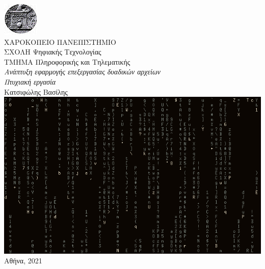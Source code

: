 \thispagestyle{plain}
  \begin{center}
    \includegraphics[scale=1]{"hua.png"}\\
    \vspace{1cm}
    {\huge ΧΑΡΟΚΟΠΕΙΟ ΠΑΝΕΠΙΣΤΗΜΙΟ}\\
        \vspace{1cm}
    {\Large ΣΧΟΛΗ Ψηφιακής Τεχνολογίας}\\
    {\Large ΤΜΗΜΑ Πληροφορικής και Τηλεματικής}\\
        \vspace{5cm}
    {\large \textit{Ανάπτυξη εφαρμογής επεξεργασίας δυαδικών αρχείων}}\\
       \vspace{1cm} 
  \textit{Πτυχιακή εργασία}\\
    {\large Κατσιφώλης Βασίλης}\\
    
    \vspace{1cm}
    \includegraphics[scale=0.5]{"static/cover.png"}\\
    \vspace{3cm}
    Αθήνα, 2021\\

  \end{center}
\pagebreak

